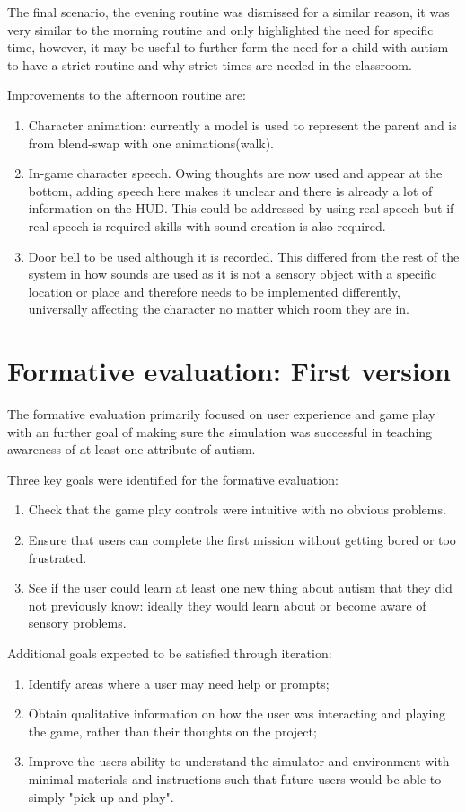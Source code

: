 \documentclass[11pt]{report}
\begin{document}
The final scenario, the evening routine was dismissed for a similar reason, it was very similar to the morning routine and only highlighted the need for specific time, however, it may be useful to further form the need for a child with autism to have a strict routine and why strict times are needed in the classroom.

Improvements to the afternoon routine are:
\begin{enumerate}
\item Character animation: currently a model is used to represent the parent and is from blend-swap with one animations(walk).
\item In-game character speech. Owing thoughts are now used and appear at the bottom, adding speech here makes it unclear and there is already a lot of information on the HUD. This could be addressed by using real speech but if real speech is required skills with sound creation is also required. 
\item Door bell to be used although it is recorded. This differed from the rest of the system in how sounds are used as it is not a sensory object with a specific location or place and therefore needs to be implemented differently, universally affecting the character no matter which room they are in.
\end{enumerate}

\chapter{Formative evaluation: First version}
The formative evaluation primarily focused on user experience and game play with an further goal of making sure the simulation was successful in teaching awareness of at least one attribute of autism. 

Three key goals were identified for the formative evaluation: 
\begin{enumerate}
\item Check that the game play controls were intuitive with no obvious problems. 
\item Ensure that users can complete the first mission without getting bored or too frustrated. 
\item See if the user could learn at least one new thing about autism that they did not previously know: ideally they would learn about or become aware of sensory problems.
\end{enumerate}

Additional goals expected to be satisfied through iteration:
\begin{enumerate}
\item Identify areas where a user may need help or prompts;
\item Obtain qualitative information on how the user was interacting and playing the game, rather than their thoughts on the project;
\item Improve the users ability to understand the simulator and environment with minimal materials and instructions such that future users would be able to simply "pick up and play".
\end{enumerate}
\end{document}
